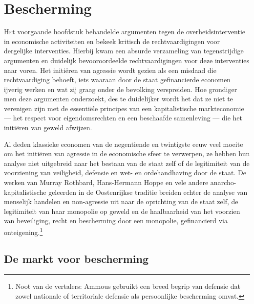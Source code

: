 \hypertarget{bescherming}{%
\chapter{Bescherming}\label{bescherming}}

\lettrine[]{H}et voorgaande hoofdstuk behandelde argumenten tegen de overheidsinterventie in economische activiteiten en bekeek kritisch de rechtvaardigingen voor dergelijke interventies. Hierbij kwam een absurde verzameling van tegenstrijdige argumenten en duidelijk bevooroordeelde rechtvaardigingen voor deze interventies naar voren. Het initiëren van agressie wordt gezien als een misdaad die rechtvaardiging behoeft, iets waaraan door de staat gefinancierde economen ijverig werken en wat zij graag onder de bevolking verspreiden. Hoe grondiger men deze argumenten onderzoekt, des te duidelijker wordt het dat ze niet te verenigen zijn met de essentiële principes van een kapitalistische markteconomie — het respect voor eigendomsrechten en een beschaafde samenleving — die het initiëren van geweld afwijzen.

Al deden klassieke economen van de negentiende en twintigste eeuw veel moeite om het initiëren van agressie in de economische sfeer te verwerpen, ze hebben hun analyse niet uitgebreid naar het bestaan van de staat zelf of de legitimiteit van de voorziening van veiligheid, defensie en wet- en ordehandhaving door de staat. De werken van Murray Rothbard,\autocite{195} Hans-Hermann Hoppe\autocite{196} en vele andere anarcho-kapitalistische geleerden in de Oostenrijkse traditie breiden echter de analyse van menselijk handelen en non-agressie uit naar de oprichting van de staat zelf, de legitimiteit van haar monopolie op geweld en de haalbaarheid van het voorzien van beveiliging, recht en bescherming door een monopolie, gefinancierd via onteigening.\footnote{Noot van de vertalers: Ammous gebruikt een breed begrip van defensie dat zowel nationale of territoriale defensie als persoonlijke bescherming omvat.}

\hypertarget{de-markt-voor-bescherming}{%
\section{De markt voor bescherming}\label{de-markt-voor-bescherming}}

